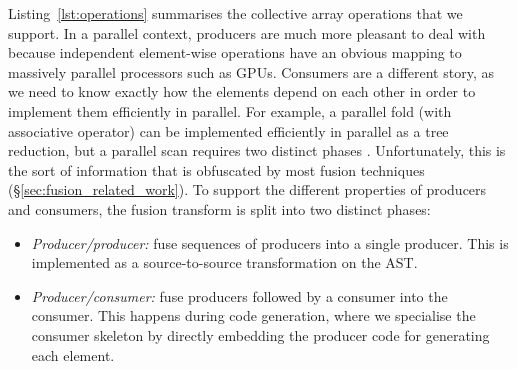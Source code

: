 Listing~\ref{lst:operations} summarises the collective array operations that we
support. In a parallel context, producers are much more pleasant to deal with
because independent element-wise operations have an obvious mapping to massively
parallel processors such as GPUs. Consumers are a different story, as
we need to know exactly how the elements depend on each other in order to
implement them efficiently in parallel. For example, a parallel fold (with
associative operator) can be implemented efficiently in parallel as a tree
reduction, but a parallel scan requires two distinct phases
\cite{Chatterjee:1990vj,Sengupta:2007tc}. Unfortunately, this is the sort of
information that is obfuscated by most fusion techniques
(\S\ref{sec:fusion_related_work}). To support the different properties of
producers and consumers, the fusion transform is split into two distinct phases:
%
\begin{itemize}
    \item \emph{Producer/producer:} fuse sequences of producers into a single
        producer. This is implemented as a source-to-source transformation on
        the AST.

    \item \emph{Producer/consumer:} fuse producers followed by a consumer into
        the consumer. This happens during code generation, where we specialise
        the consumer skeleton by directly embedding the producer code for
        generating each element.
\end{itemize}


